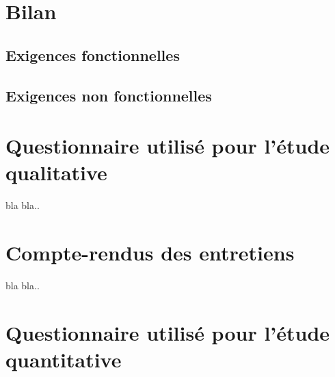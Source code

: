 \documentclass[a4paper, 11px]{article}
\begin{document}
\newpage

\section{Bilan}

\subsection{Exigences fonctionnelles}


\subsection{Exigences non fonctionnelles}


\appendix
\addappheadtotoc

\newpage

\section{Questionnaire utilisé pour l'étude qualitative}

bla bla..
\newpage

\section{Compte-rendus des entretiens}

bla bla..
\newpage

\section{Questionnaire utilisé pour l'étude quantitative}
\end{document}
